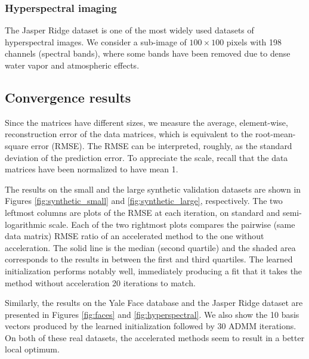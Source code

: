 \documentclass{article}
\begin{document}
\subsubsection{Hyperspectral imaging}
The Jasper Ridge dataset \cite{rodarmel2002principal} is one of the most widely used datasets of hyperspectral images. We consider a sub-image of $100\times100$ pixels with 198 channels \citep{Zhu2017HyperspectralUG} (spectral bands), where some bands have been removed due to dense water vapor and atmospheric effects. %


\subsection{Convergence results}
Since the matrices have different sizes, we measure the average, element-wise, reconstruction error of the data matrices, which is equivalent to the root-mean-square error (RMSE). The RMSE can be interpreted, roughly, as the standard deviation of the prediction error. To appreciate the scale, recall that the data matrices have been normalized to have mean 1.

The results on the small and the large synthetic validation datasets are shown in Figures \ref{fig:synthetic_small} and \ref{fig:synthetic_large}, respectively. The two leftmost columns are plots of the RMSE at each iteration, on standard and semi-logarithmic scale. Each of the two rightmost plots compares the pairwise (same data matrix) RMSE ratio of an accelerated method to the one without acceleration. The solid line is the median (second quartile) and the shaded area corresponds to the results in between the first and third quartiles. The learned initialization performs notably well, immediately producing a fit that it takes the method without acceleration 20 iterations to match.

Similarly, the results on the Yale Face database and the Jasper Ridge dataset are presented in Figures \ref{fig:faces} and \ref{fig:hyperspectral}. We also show the 10 basis vectors produced by the learned initialization followed by 30 ADMM iterations. On both of these real datasets, the accelerated methods seem to result in a better local optimum.
\end{document}
